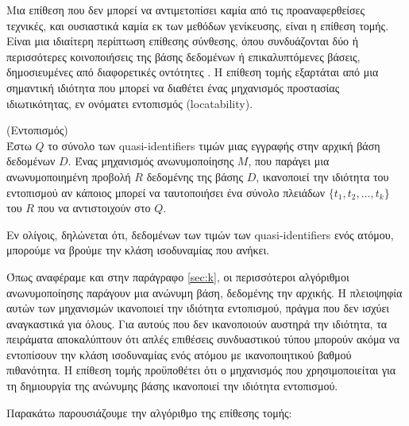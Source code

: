 Μια επίθεση που δεν μπορεί να αντιμετοπίσει καμία από τις προαναφερθείσες τεχνικές, και ουσιαστικά καμία εκ των μεθόδων γενίκευσης, είναι η επίθεση τομής. 
Είναι μια ιδιαίτερη περίπτωση επίθεσης σύνθεσης, όπου συνδυάζονται δύο ή περισσότερες κοινοποιήσεις της βάσης δεδομένων ή επικαλυπτόμενες βάσεις, δημοσιευμένες από διαφορετικές οντότητες \textlatin{\cite{ganta2008composition}}. 
Η επίθεση τομής εξαρτάται από μια σημαντική ιδιότητα που μπορεί να διαθέτει ένας μηχανισμός προστασίας ιδιωτικότητας, εν ονόματει εντοπισμός (\textlatin{locatability}).

\begin{definition}(Εντοπισμός)\\
Έστω $Q$ το σύνολο των \textlatin{quasi-identifiers} τιμών μιας εγγραφής στην αρχική βάση δεδομένων $D$. Ένας μηχανισμός ανωνυμοποίησης $M$, που παράγει μια ανωνυμοποιημένη προβολή $R$ δεδομένης της βάσης $D$, ικανοποιεί την ιδιότητα του εντοπισμού αν κάποιος μπορεί να ταυτοποιήσει ένα σύνολο πλειάδων $\{t_1,t_2,...,t_k\}$ του $R$ που να αντιστοιχούν στο $Q$.
\end{definition}

Εν ολίγοις, δηλώνεται ότι, δεδομένων των τιμών των \textlatin{quasi-identifiers} ενός ατόμου, μπορούμε να βρούμε την κλάση ισοδυναμίας που ανήκει.

Όπως αναφέραμε και στην παράγραφο \ref{sec:k}, οι περισσότεροι αλγόριθμοι ανωνυμοποίησης παράγουν μια ανώνυμη βάση, δεδομένης την αρχικής. 
Η πλειοψηφία αυτών των μηχανισμών ικανοποιεί την ιδιότητα εντοπισμού, πράγμα που δεν ισχύει αναγκαστικά για όλους. 
Για αυτούς που δεν ικανοποιούν αυστηρά την ιδιότητα, τα πειράματα αποκαλύπτουν ότι απλές επιθέσεις συνδυαστικού τύπου μπορούν ακόμα να εντοπίσουν την κλάση ισοδυναμίας ενός ατόμου με ικανοποιητικού βαθμού πιθανότητα.
Η επίθεση τομής προϋποθέτει ότι ο μηχανισμός που χρησιμοποιείται για τη δημιουργία της ανώνυμης βάσης ικανοποιεί την ιδιότητα εντοπισμού.

Παρακάτω παρουσιάζουμε την αλγόριθμο της επίθεσης τομής:\\


